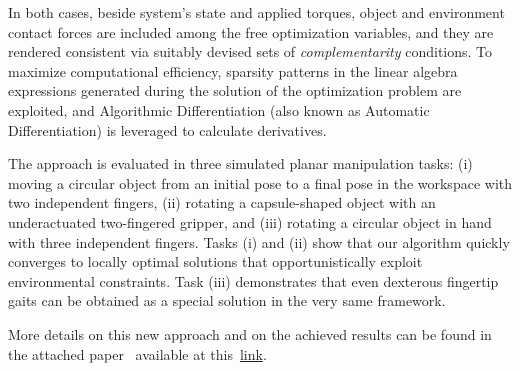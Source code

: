 In both cases, beside system's state and applied torques, object and environment contact forces are included among the free optimization variables, and they are rendered consistent via suitably devised sets of \emph{complementarity} conditions. To maximize computational efficiency, sparsity patterns in the linear algebra expressions generated during the solution of the optimization problem are exploited, and Algorithmic Differentiation (also known as Automatic Differentiation) is leveraged to calculate derivatives.

The approach is evaluated in three simulated planar manipulation tasks: (i) moving a circular object from an initial pose to a final pose in the workspace with two independent fingers, (ii) rotating a capsule-shaped object with an underactuated two-fingered gripper, and (iii) rotating a circular object in hand with three independent fingers. Tasks (i) and (ii) show that our algorithm quickly converges to locally optimal solutions that opportunistically exploit environmental constraints. Task (iii) demonstrates that even dexterous fingertip gaits can be obtained as a special solution in the very same framework.

More details on this new approach and on the achieved results can be found in the attached paper~\cite{Gabiccini:RSS:2015} available at this~\href{./attachedPapers/ComputationalFrameworkEnvAwareRobManipPlanning.pdf}{link}. 